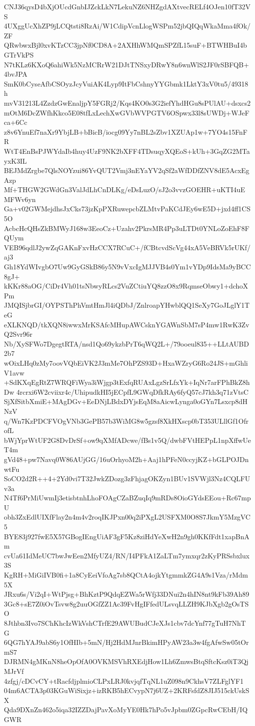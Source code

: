 CNJ36qysD4bXjOUcdGnbIJZckLkN7LekuNZ6NHZgdAXtvecRELf4OJen10fT32VS
4UXggUcXhZP9jLCQtsti8RzAi/W1CdipVcnLlogWSPm52jbQIQqWkaMma4fOk/ZF
QRwbwxBjl0xvKTzCC3jpNf0CD8A+2AXHhWMQmSPZfL15suF+BTWHBuI4bGTrVkPS
N7tKLz6KXoQ6ahiWk5NzMCRrW21DJtTNSxyDRwY8n6wnWlS2JF0rSBFQB+4bvJPA
SmK0bCyseAfbCSOyzJcyVuiAK4Lyp9ItFbCshnyYYGbmk1LktY3xV0tu5/49318h
mvV31213L4ZzdzGwEnaljpY5FGRj2/Kqs4KO0s3G2iefYhdHGu8sPUlAU+dsxcs2
mOtM6DcZWfhKkco5E08tfLxLechXwGVbWVPGTV6OSpwx33l8sUWDj+WJeFca+6Cc
z8v6YnuEf7naXr9YbjLB+bBicB/iocg09Yy7nBL2sZbv1XZUAp1w+7YO4s15FnFR
WtT4EnBsPJWYdaIb4huy4UzF9NK2bXFF4TDsuqyXQEoS+kUh+3GqZG2MTayxK3IL
BEJMdZrgbe7QlsNOYzui86YvQUT2Vmj3nEYaYV2qSf2aWfDDfZNV8dE5AcxEgAzp
Mf+THGW2GWdGn3ValJdLhCnDLKg/eDsLuzO/sJ2o3vvzGOEHR+uKTI4uEMFWv6yn
Ga+v02GWMejdhsJxCks73jzKpPXRuwepcbZLMtvPaKCdJEy6wE5D+jxd4ff1CS5O
AcbcHcQHsZkBMWyJ168w3EeoCz+Uzahv2PkrsMR4Pp3uLTDt0YNLoZoEhF8FQUym
VEB96qdlJ2ywZqGAKnFxvHzCCX7RCuC+/fCBtcvdScVg44xA5VeBRVk5rUKf/aj3
Gh18YdWIvgbO7Uw9GyGSkB86y5N9vVxcIgMJJVB4s0Ym1vYDp9IdsMa9yBCC8gJ+
kKKr88aOG/CiDr4Vh01tsNbwyRLcs2VuZCtiuYQ8zzO8x9RqmseObwy1+dchoXPm
JMQISjbrGI/OYPSThPhVmtHmJl4iQDbJ/ZnlroapYHwblQQ1SeXy7GoJLglY1TeG
eXLKNQD/tkXQN8iwwxMrKSAfcMHupAWCsknYGAWnSbM7sP4mw1RwK3ZvQ2Svr96r
Nb/XySFWo7DgegtRTA/nsd1Qo69ykzbPrT6qWQ2L+/79ooeul835++LLtAUBD2b7
wOixLHq0zMy7oovVQbEiVK2J3mMe7OhPZS93D+HxaWZryG6Ro24JS+mGhliV1avw
+SdKXqEgRtZ7WRQFiWya3iWjgp3tExfqRUAxLgzSrLfxYk+IqNr7arFPhBkZ8hDw
4rcrxi6W2cviixr4c/UhipudkHI5jECpfL9GWqDfkRAy6fyQ57cJ7kh3q71zVtsC
SjXfSitbXmiE+MAgDGv+EeDNjLBdxDYjsEqM8aAicwLynga0oGYn7Lsxcp8dHNzV
q/Wn7KzPDCFVOgVNb3GePB57b3WiMG8w5gzsf8XkHXscp0bT353ULllGf1OfrofL
bWjYprWtUF2G8DvDrSf+ow9qXMfADcwe/fBs1v5Q/dwbFVtHEPpL1npXffwUeT4m
gVd48+pw7Navq0W86AUjGG/16uOrhyoM2h+Aaj1hPFeN0ccyjKZ+bGLPOJDnwtFu
SoCO2d2R++4+2Yd0vi7T32JwkZDozg3zFhjagOKZyn1BUv1SVWjl3Nz4CQLFUv3a
N4Tf6PrMiUwmIj3etisbtnhLhoFOAgCZaBZuqIq9mRDs8OioGYdsEEou+Rc67mpU
obh3ZxEdlUIXfFlay2n4m4v2roqIKJPxn00q2iPXgL2USFXM0O8S7JkmY5MzgVC5
BYE83j927fwE5X57GBogIEngUiAF3gF5Kz8ziHdYeXwH2n9gh0KKfFdt1xapBnAm
cvUa61IdMeUC7bwJwEen2MfyUZ4/RN/I4PFkA1ZaLTm7ymxqr2zKyPRSsbxlux3S
KgRH+MiGiIVB0fi+1a8CyEeiVfoAg7sb8QCtA4ojkYtgmmkZG4A9s1Vza/rMdm5X
JRxu6s/Vi2qI+WtPjsg+BhKztP9QdqEZWa5rWfj33DNui2n4hIN8nt9kFb39Ah89
3Gc8+sE7Z0iOvTsvw8g2uuOGfZZ1Ac39FvHgIFfedULsvqLLZH9KJbXgb2gOsTSO
8Jthbn3Ivo7SChKhcIzWkVshCTrfE29AWUBudCJeXJs1cbv7dcYnf77gTuH7NhTG
6QG7hYAJ9abS6y1OfHIb+5mN/Hj2HdMJnrBkimHPyAW23a3w4fgAfwSw05tOrmS7
DJRMN4gMKnN8heOpOfA0OVKMSVhRXEdjHow1Lh6ZmwsBtqSftcKsz0iT3QjMJrVf
4zfgj/cDCvCY+tRacfdjplmioCLPxLRJ0kvjqfTqNL1uZ098n9CkhsV7ZLFglYF1
04m6ACTA3p03KGuWiSixjz+izRKB5hECvypN7j6UZ+2KRFsfdZ8JIJ515ckUskSX
Qda9DXnZn462o5iqa32IZZDajPavXoMyYE0Hk7hPo5vJpbm0ZGpcRwCEbH/IQGWR

